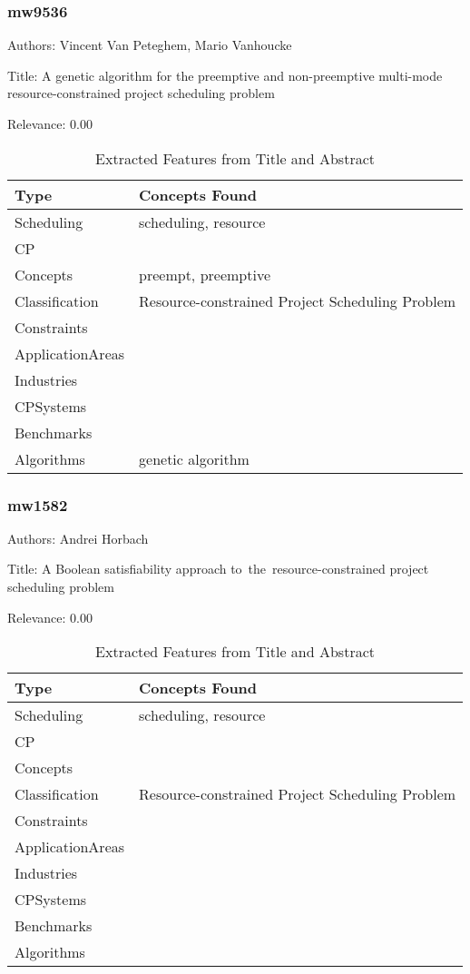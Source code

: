 \subsubsection{mw9536}
\label{mw:mw9536}

Authors: Vincent Van Peteghem, Mario Vanhoucke

Title: A genetic algorithm for the preemptive and non-preemptive multi-mode resource-constrained project scheduling problem

Relevance:  0.00

{\scriptsize
\begin{longtable}{p{2cm}p{20cm}}
\caption{Extracted Features from Title and Abstract}\\ \toprule
Type & Concepts Found\\ \midrule
\endhead
\bottomrule
\endfoot
Scheduling & scheduling, resource\\ 
CP & \\ 
Concepts & preempt, preemptive\\ 
Classification & Resource-constrained Project Scheduling Problem\\ 
Constraints & \\ 
ApplicationAreas & \\ 
Industries & \\ 
CPSystems & \\ 
Benchmarks & \\ 
Algorithms & genetic algorithm\\ 
\end{longtable}
}



\subsubsection{mw1582}
\label{mw:mw1582}

Authors: Andrei Horbach

Title: A Boolean satisfiability approach to the resource-constrained project scheduling problem

Relevance:  0.00

{\scriptsize
\begin{longtable}{p{2cm}p{20cm}}
\caption{Extracted Features from Title and Abstract}\\ \toprule
Type & Concepts Found\\ \midrule
\endhead
\bottomrule
\endfoot
Scheduling & scheduling, resource\\ 
CP & \\ 
Concepts & \\ 
Classification & Resource-constrained Project Scheduling Problem\\ 
Constraints & \\ 
ApplicationAreas & \\ 
Industries & \\ 
CPSystems & \\ 
Benchmarks & \\ 
Algorithms & \\ 
\end{longtable}
}



